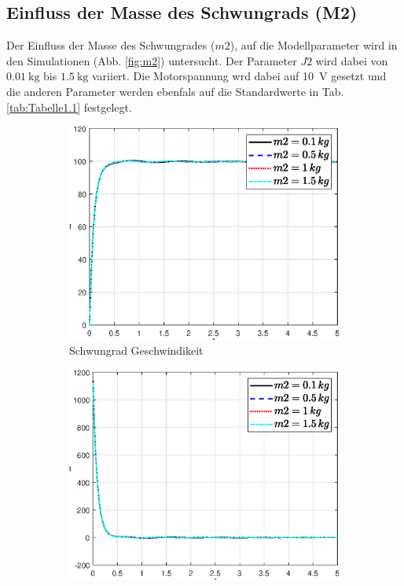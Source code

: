  \subsection*{Einfluss der Masse des Schwungrads (M2)}
 Der Einfluss der Masse des Schwungrades ($m2$), auf die Modellparameter wird in den Simulationen (Abb. \ref{fig:m2}) untersucht. 
 Der Parameter $J2$ wird dabei von $\SI{0.01}{\kg}$ bis $\SI{1.5}{\kg}$ variiert.
 Die Motorspannung wrd dabei auf \SI{10}{\volt} gesetzt und die anderen Parameter werden ebenfals auf die Standardwerte in Tab. \ref{tab:Tabelle1.1} festgelegt.\\
 \begin{figure}
    \captionsetup[subfigure]{justification=centering,font=footnotesize}
    \begin{subfigure}[b]{0.49\linewidth}
        \includegraphics[width=\linewidth]{plot_data/parameter/fig/m2/phi_punkt.eps}
        \caption{Schwungrad Geschwindikeit}
        \label{fig:m2_phi_punkt}
    \end{subfigure}
    \begin{subfigure}[b]{0.49 \linewidth}
        \includegraphics[width=\linewidth]{plot_data/parameter/fig/m2/phi_punkt_punkt.eps}

\end{subfigure}
\end{figure}
